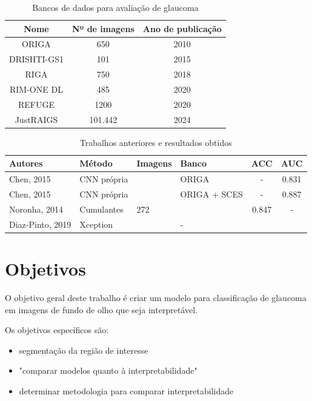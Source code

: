 \documentclass[12pt]{article}
\begin{document}
\begin{table}[htb]
    \centering
    \begin{tabular}{|c|c|c|}
    \hline
    Nome & Nº de imagens & Ano de publicação \\
    \hline
    ORIGA & 650 & 2010 \\
    \hline
    DRISHTI-GS1 & 101 & 2015 \\
    \hline
    RIGA & 750 & 2018 \\
    \hline
    RIM-ONE DL & 485 & 2020 \\
    \hline
    REFUGE & 1200 & 2020 \\
    \hline
    JustRAIGS & 101.442 & 2024 \\
    \hline
    \end{tabular}
    \caption{Bancos de dados para avaliação de glaucoma}
    \label{tab:datasets}
\end{table}


\begin{table}[htb]
    \centering
    \begin{tabular}{|l|l|l|l|c|c|}
    \hline
    Autores          & Método          & Imagens & Banco        & ACC     & AUC   \\
    \hline
    Chen, 2015       & CNN própria     &         & ORIGA        & -       & 0.831 \\
    \hline
    Chen, 2015       & CNN própria     &         & ORIGA + SCES & -       & 0.887 \\
    \hline
    Noronha, 2014    & Cumulantes      & 272     &              & 0.847  &  -     \\
    \hline
    Diaz-Pinto, 2019 & Xception        &         & -            &        &        \\
    \hline
    \end{tabular}
    \caption{Trabalhos anteriores e resultados obtidos}
    \label{tab:trabalhos}
\end{table}

\bigskip

\section{Objetivos}
\label{sec:objetivo}

O objetivo geral deste trabalho é criar um modelo para classificação de glaucoma em imagens de fundo de olho que seja interpretável.

Os objetivos específicos são:
\begin{itemize}
 \item segmentação da região de interesse
 \item "comparar modelos quanto à interpretabilidade"
 \item determinar metodologia para comparar interpretabilidade
\end{itemize}
\end{document}
